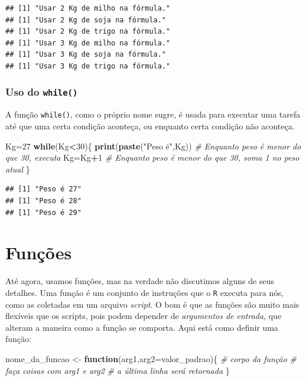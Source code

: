 \documentclass[
]{book}
\newenvironment{Shaded}{\begin{snugshade}}{\end{snugshade}}
\newcommand{\CommentTok}[1]{\textcolor[rgb]{0.56,0.35,0.01}{\textit{#1}}}
\newcommand{\ControlFlowTok}[1]{\textcolor[rgb]{0.13,0.29,0.53}{\textbf{#1}}}
\newcommand{\DataTypeTok}[1]{\textcolor[rgb]{0.13,0.29,0.53}{#1}}
\newcommand{\DecValTok}[1]{\textcolor[rgb]{0.00,0.00,0.81}{#1}}
\newcommand{\KeywordTok}[1]{\textcolor[rgb]{0.13,0.29,0.53}{\textbf{#1}}}
\newcommand{\NormalTok}[1]{#1}
\newcommand{\OperatorTok}[1]{\textcolor[rgb]{0.81,0.36,0.00}{\textbf{#1}}}
\newcommand{\StringTok}[1]{\textcolor[rgb]{0.31,0.60,0.02}{#1}}
\theoremstyle{definition}
\theoremstyle{definition}
\theoremstyle{definition}
\theoremstyle{remark}
\begin{document}
\begin{verbatim}
## [1] "Usar 2 Kg de milho na fórmula."
## [1] "Usar 2 Kg de soja na fórmula."
## [1] "Usar 2 Kg de trigo na fórmula."
## [1] "Usar 3 Kg de milho na fórmula."
## [1] "Usar 3 Kg de soja na fórmula."
## [1] "Usar 3 Kg de trigo na fórmula."
\end{verbatim}

\hypertarget{uso-do-while}{%
\subsubsection{\texorpdfstring{Uso do \texttt{while()}}{Uso do while()}}\label{uso-do-while}}

A função \texttt{while()}, como o próprio nome sugre, é usada para executar uma tarefa até que uma certa condição aconteça, ou enquanto certa condição não aconteça.

\begin{Shaded}
\begin{Highlighting}[]
\NormalTok{Kg=}\DecValTok{27}
\ControlFlowTok{while}\NormalTok{(Kg}\OperatorTok{<}\DecValTok{30}\NormalTok{)\{}
  \KeywordTok{print}\NormalTok{(}\KeywordTok{paste}\NormalTok{(}\StringTok{"Peso é"}\NormalTok{,Kg)) }\CommentTok{# Enquanto peso é menor do que 30, executa}
\NormalTok{  Kg=Kg}\OperatorTok{+}\DecValTok{1} \CommentTok{# Enquanto peso é menor do que 30, soma 1 no peso atual}
\NormalTok{\}}
\end{Highlighting}
\end{Shaded}

\begin{verbatim}
## [1] "Peso é 27"
## [1] "Peso é 28"
## [1] "Peso é 29"
\end{verbatim}

\hypertarget{funuxe7uxf5es}{%
\section{Funções}\label{funuxe7uxf5es}}

Até agora, usamos funções, mas na verdade não discutimos alguns de seus detalhes. Uma função é um conjunto de instruções que o \texttt{R} executa para nós, como as coletadas em um arquivo \emph{script}. O bom é que as funções são muito mais flexíveis que os scripts, pois podem depender de \emph{argumentos de entrada}, que alteram a maneira como a função se comporta. Aqui está como definir uma função:

\begin{Shaded}
\begin{Highlighting}[]
\NormalTok{nome_da_funcao <-}\StringTok{ }\ControlFlowTok{function}\NormalTok{(arg1,}\DataTypeTok{arg2=}\NormalTok{valor_padrao)\{}
  \CommentTok{# corpo da função}
  \CommentTok{# faça coisas com arg1 e arg2}
  \CommentTok{# a última linha será retornada}
\NormalTok{\}}
\end{Highlighting}
\end{Shaded}
\end{document}
